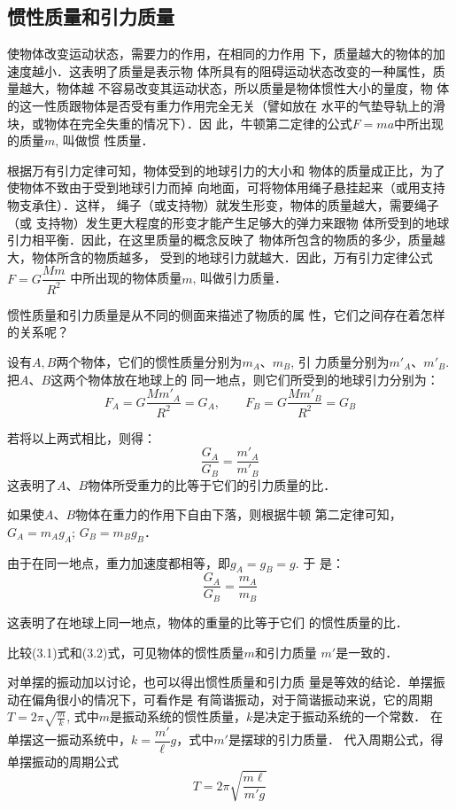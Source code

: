 \subsection{惯性质量和引力质量}
使物体改变运动状态，需要力的作用，在相同的力作用
下，质量越大的物体的加速度越小．这表明了质量是表示物
体所具有的阻碍运动状态改变的一种属性，质量越大，物体越
不容易改变其运动状态，所以质量是物体惯性大小的量度，物
体的这一性质跟物体是否受有重力作用完全无关（譬如放在
水平的气垫导轨上的滑块，或物体在完全失重的情况下）．因
此，牛顿第二定律的公式$F=ma$中所出现的质量$m$, 叫做惯
性质量．

根据万有引力定律可知，物体受到的地球引力的大小和
物体的质量成正比，为了使物体不致由于受到地球引力而掉
向地面，可将物体用绳子悬挂起来（或用支持物支承住）．这样，
绳子（或支持物）就发生形变，物体的质量越大，需要绳子（或
支持物）发生更大程度的形变才能产生足够大的弹力来跟物
体所受到的地球引力相平衡．因此，在这里质量的概念反映了
物体所包含的物质的多少，质量越大，物体所含的物质越多，
受到的地球引力就越大．因此，万有引力定律公式
$F=G\dfrac{Mm}{R^2}$
中所出现的物体质量$m$, 叫做引力质量．

惯性质量和引力质量是从不同的侧面来描述了物质的属
性，它们之间存在着怎样的关系呢？

设有$A,B$两个物体，它们的惯性质量分别为$m_A$、$m_B$, 引
力质量分别为$m'_A$、$m'_B$. 把$A$、$B$这两个物体放在地球上的
同一地点，则它们所受到的地球引力分别为：
\[F_A=G\frac{Mm'_A}{R^2}=G_A,\qquad F_B=G\frac{Mm'_B}{R^2}=G_B\]

若将以上两式相比，则得：
\begin{equation}
    \frac{G_A}{G_B}=\frac{m'_A}{m'_B}
\end{equation}
这表明了$A$、$B$物体所受重力的比等于它们的引力质量的比．

如果使$A$、$B$物体在重力的作用下自由下落，则根据牛顿
第二定律可知，$G_A=m_Ag_A$; $G_B=m_Bg_B$．

由于在同一地点，重力加速度都相等，即$g_A=g_B=g$. 于
是：
\begin{equation}
    \frac{G_A}{G_B}=\frac{m_A}{m_B}
\end{equation}

这表明了在地球上同一地点，物体的重量的比等于它们
的惯性质量的比．

比较(3.1)式和(3.2)式，可见物体的惯性质量$m$和引力质量
$m'$是一致的．

对单摆的振动加以讨论，也可以得出惯性质量和引力质
量是等效的结论．单摆振动在偏角很小的情况下，可看作是
有简谐振动，对于简谐振动来说，它的周期$T=2\pi\sqrt{\frac{m}{k}}$, 
式中$m$是振动系统的惯性质量，$k$是决定于振动系统的一个常数．
在单摆这一振动系统中，$k=\dfrac{m'}{\ell}g$，式中$m'$是摆球的引力质量．
代入周期公式，得单摆振动的周期公式
\[T=2\pi\sqrt{\frac{m\ell}{m'g}}\]

